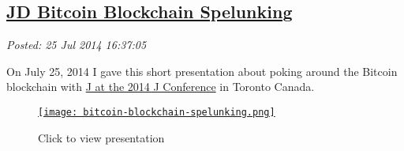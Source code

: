 %

\subsection*{\href{http://bakerjd99.wordpress.com/2014/07/25/jd-bitcoin-blockchain-spelunking/}{JD Bitcoin Blockchain Spelunking}}


\noindent\emph{Posted: 25 Jul 2014 16:37:05}
\vspace{6pt}

On July 25, 2014 I gave this short presentation about poking around the
Bitcoin blockchain with \href{http://www.jsoftware.com/jwiki/Community/Conference2014}{J at the
2014 J Conference} in Toronto Canada.



\captionsetup[figure]{labelformat=empty}


\begin{figure}[htbp]
\centering
\href{https://docs.google.com/presentation/d/1yZXHZ1939HMRYWdIIlgszjaw7p1VnH-CH-6iR0ZqQcw/edit?usp=sharing}{\texttt{[image: bitcoin-blockchain-spelunking.png]}}
\caption{Click to view presentation}
\label{fig:4793X0}
\end{figure}


%